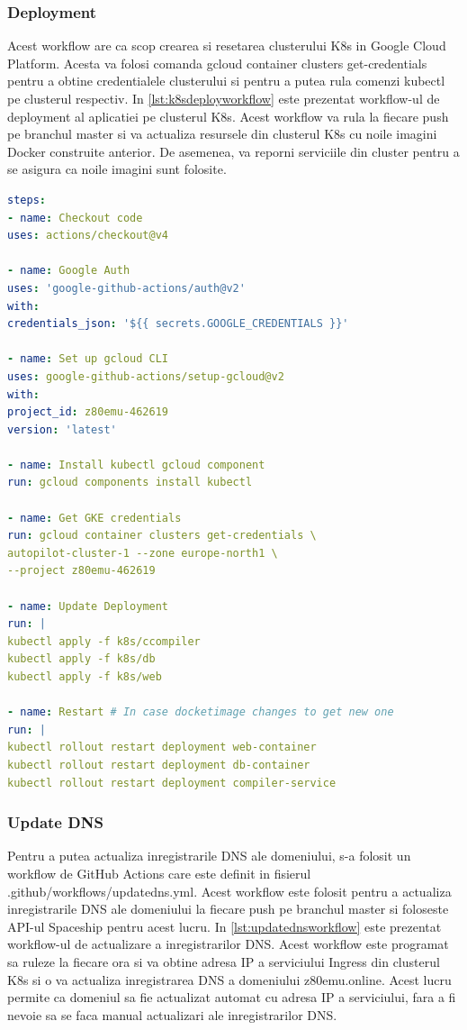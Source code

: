 \documentclass[titlepage,12pt]{article}
\DeclareRobustCommand{\code}[1]{{\ttfamily\small #1}}
\begin{document}
\subsubsection{Deployment}
Acest workflow are ca scop crearea si resetarea clusterului \ac {K8s} in Google Cloud Platform. Acesta va folosi comanda \code{gcloud container clusters get-credentials} pentru a obtine credentialele clusterului si pentru a putea rula comenzi \code{kubectl} pe clusterul respectiv. In \cref{lst:k8sdeployworkflow} este prezentat workflow-ul de deployment al aplicatiei pe clusterul \ac {K8s}. Acest workflow va rula la fiecare push pe branchul \code{master} si va actualiza resursele din clusterul \ac {K8s} cu noile imagini Docker construite anterior. De asemenea, va reporni serviciile din cluster pentru a se asigura ca noile imagini sunt folosite.

\begin{lstlisting}[language=yaml,caption={Workflow deployment K8s},label={lst:k8sdeployworkflow}]
steps:
- name: Checkout code
uses: actions/checkout@v4

- name: Google Auth
uses: 'google-github-actions/auth@v2'
with:
credentials_json: '${{ secrets.GOOGLE_CREDENTIALS }}'

- name: Set up gcloud CLI
uses: google-github-actions/setup-gcloud@v2
with:
project_id: z80emu-462619
version: 'latest'

- name: Install kubectl gcloud component
run: gcloud components install kubectl

- name: Get GKE credentials
run: gcloud container clusters get-credentials \
autopilot-cluster-1 --zone europe-north1 \
--project z80emu-462619

- name: Update Deployment
run: |
kubectl apply -f k8s/ccompiler
kubectl apply -f k8s/db
kubectl apply -f k8s/web

- name: Restart # In case docketimage changes to get new one
run: |
kubectl rollout restart deployment web-container
kubectl rollout restart deployment db-container
kubectl rollout restart deployment compiler-service
\end{lstlisting}

\subsubsection{Update DNS}
Pentru a putea actualiza inregistrarile \ac {DNS} ale domeniului, s-a folosit un workflow de GitHub Actions care este definit in fisierul \code{.github/workflows/updatedns.yml}. Acest workflow este folosit pentru a actualiza inregistrarile \ac {DNS} ale domeniului la fiecare push pe branchul \code{master} si foloseste API-ul Spaceship pentru acest lucru. In \cref{lst:updatednsworkflow} este prezentat workflow-ul de actualizare a inregistrarilor \ac {DNS}. Acest workflow este programat sa ruleze la fiecare ora si va obtine adresa IP a serviciului \code{Ingress} din clusterul \ac {K8s} si o va actualiza inregistrarea \ac {DNS} a domeniului \code{z80emu.online}. Acest lucru permite ca domeniul sa fie actualizat automat cu adresa IP a serviciului, fara a fi nevoie sa se faca manual actualizari ale inregistrarilor \ac {DNS}.
\end{document}
